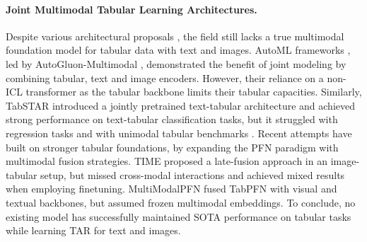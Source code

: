 \documentclass{article}
\begin{document}
\paragraph{Joint Multimodal Tabular Learning Architectures.} Despite various architectural proposals \cite{hager_best_2023, jiang_tabular_2024, ebrahimi_lanistr_2024, hu_pytorch_2024, leonardis_tip_2025}, the field still lacks a true multimodal foundation model for tabular data with text and images. AutoML \cite{he_automl_2021} frameworks \cite{shi_benchmarking_2021, tang_autogluon-multimodal_2024, tang_bag_2024}, led by AutoGluon-Multimodal \cite{tang_autogluon-multimodal_2024}, demonstrated the benefit of joint modeling by combining tabular, text and image encoders. However, their reliance on a non-ICL transformer \cite{gorishniy_revisiting_2021} as the tabular backbone limits their tabular capacities. Similarly, TabSTAR \cite{arazi_tabstar_2025} introduced a jointly pretrained text-tabular architecture and achieved strong performance on text-tabular classification tasks, but it struggled with regression tasks and with unimodal tabular benchmarks \cite{erickson_tabarena_2025}. Recent attempts have built on stronger tabular foundations, by expanding the PFN paradigm with multimodal fusion strategies. TIME \cite{luo_time_2025} proposed a late-fusion approach in an image-tabular setup, but missed cross-modal interactions and achieved mixed results when employing finetuning. MultiModalPFN \cite{kim_multimodalpfn_2025} fused TabPFN with visual and textual backbones, but assumed frozen multimodal embeddings. To conclude, no existing model has successfully maintained SOTA performance on tabular tasks while learning TAR for text and images.
\end{document}
